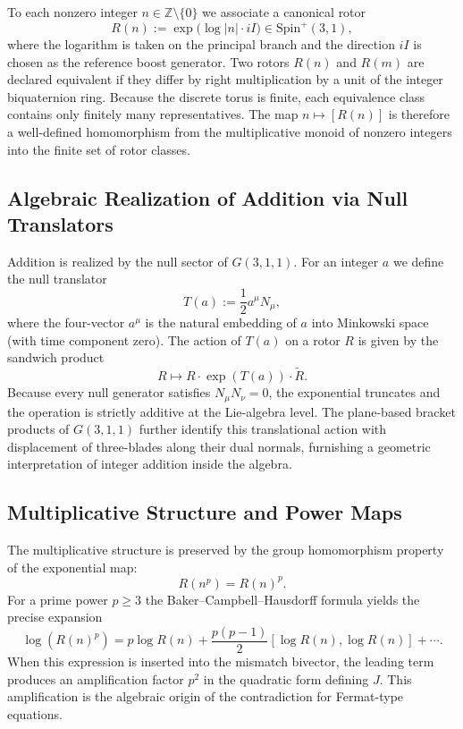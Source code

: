 \documentclass[dvipdfmx,a4paper]{article}
\theoremstyle{definition}
\theoremstyle{remark}
\begin{document}
To each nonzero integer \( n \in \mathbb{Z} \setminus \{0\} \) we associate a canonical rotor
\[
R(n) := \exp\bigl( \log |n| \cdot iI \bigr) \in \mathrm{Spin}^+(3,1),
\]
where the logarithm is taken on the principal branch and the direction \( iI \) is chosen as the reference boost generator. Two rotors \( R(n) \) and \( R(m) \) are declared equivalent if they differ by right multiplication by a unit of the integer biquaternion ring. Because the discrete torus is finite, each equivalence class contains only finitely many representatives. The map \( n \mapsto [R(n)] \) is therefore a well-defined homomorphism from the multiplicative monoid of nonzero integers into the finite set of rotor classes.

\subsection{Algebraic Realization of Addition via Null Translators}

Addition is realized by the null sector of \( G(3,1,1) \). For an integer \( a \) we define the null translator
\[
T(a) := \frac12 a^\mu N_\mu,
\]
where the four-vector \( a^\mu \) is the natural embedding of \( a \) into Minkowski space (with time component zero). The action of \( T(a) \) on a rotor \( R \) is given by the sandwich product
\[
R \mapsto R \cdot \exp(T(a)) \cdot \widetilde{R}.
\]
Because every null generator satisfies \( N_\mu N_\nu = 0 \), the exponential truncates and the operation is strictly additive at the Lie-algebra level. The plane-based bracket products of \( G(3,1,1) \) further identify this translational action with displacement of three-blades along their dual normals, furnishing a geometric interpretation of integer addition inside the algebra.

\subsection{Multiplicative Structure and Power Maps}

The multiplicative structure is preserved by the group homomorphism property of the exponential map:
\[
R(n^p) = R(n)^p.
\]
For a prime power \( p \geq 3 \) the Baker--Campbell--Hausdorff formula yields the precise expansion
\[
\log(R(n)^p) = p \log R(n) + \frac{p(p-1)}{2} [\log R(n), \log R(n)] + \cdots.
\]
When this expression is inserted into the mismatch bivector, the leading term produces an amplification factor \( p^2 \) in the quadratic form defining \( J \). This amplification is the algebraic origin of the contradiction for Fermat-type equations.
\end{document}
